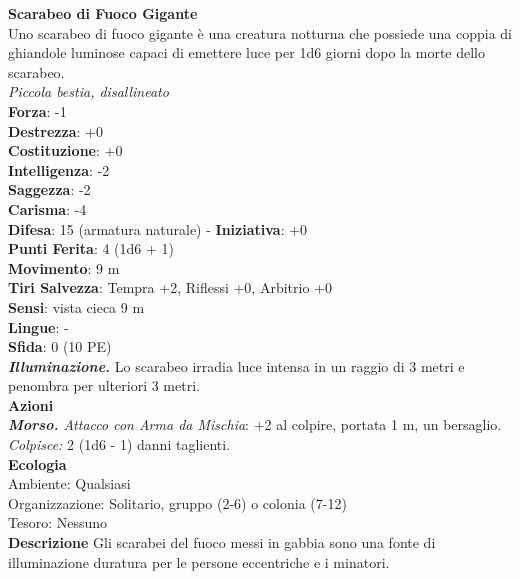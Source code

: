 \begin{multicols}{2}
\medskip\textbf{Scarabeo di Fuoco Gigante}\\
Uno scarabeo di fuoco gigante è una creatura notturna che possiede una coppia di ghiandole luminose capaci di emettere luce per 1d6 giorni dopo la morte dello scarabeo.\\
\emph{Piccola bestia, disallineato}\\
\textbf{Forza}: -1\\
\textbf{Destrezza}: +0\\
\textbf{Costituzione}: +0\\
\textbf{Intelligenza}: -2\\
\textbf{Saggezza}: -2\\
\textbf{Carisma}: -4\\
\textbf{Difesa}: 15 (armatura naturale) - \textbf{Iniziativa}: +0\\
\textbf{Punti Ferita}: 4 (1d6 + 1)\\
\textbf{Movimento}: 9 m\\
\textbf{Tiri Salvezza}: Tempra +2, Riflessi +0, Arbitrio +0\\
\textbf{Sensi}: vista cieca 9 m\\
\textbf{Lingue}: -\\
\textbf{Sfida}: 0 (10 PE)\smallskip\\
\emph{\textbf{Illuminazione.}} Lo scarabeo irradia luce intensa in un raggio di 3 metri e penombra per ulteriori 3 metri.\\
\smallskip\textbf{Azioni}\\
\emph{\textbf{Morso.} Attacco con Arma da Mischia}: +2 al colpire, portata 1 m, un bersaglio.\\
\emph{Colpisce:} 2 (1d6 - 1) danni taglienti.\\
\textbf{Ecologia}\\
Ambiente: Qualsiasi\\
Organizzazione: Solitario, gruppo (2-6) o colonia (7-12)\\
Tesoro: Nessuno\\
\textbf{Descrizione}
Gli scarabei del fuoco messi in gabbia sono una fonte di illuminazione duratura per le persone eccentriche e i minatori.


\end{multicols}
